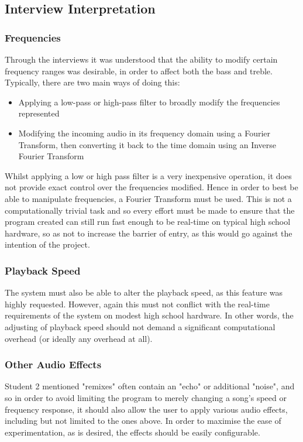 \pagebreak
\subsection{Interview Interpretation}
\subsubsection{Frequencies}
Through the interviews it was understood that the ability to modify certain frequency ranges was desirable, in order to affect both the bass and treble. Typically, there are two main ways of doing this:
\begin{itemize}
	\item Applying a low-pass or high-pass filter to broadly modify the frequencies represented
	\item Modifying the incoming audio in its frequency domain using a Fourier Transform, then converting it back to the time domain using an Inverse Fourier Transform
\end{itemize}
Whilst applying a low or high pass filter is a very inexpensive operation, it does not provide exact control over the frequencies modified. Hence in order to best be able to manipulate frequencies, a Fourier Transform must be used.  This is not a computationally trivial task and so every effort must be made to ensure that the program created can still run fast enough to be real-time on typical high school hardware, so as not to increase the barrier of entry, as this would go against the intention of the project.

\subsubsection{Playback Speed}
The system must also be able to alter the playback speed, as this feature was highly requested. However, again this must not conflict with the real-time requirements of the system on modest high school hardware. In other words, the adjusting of playback speed should not demand a significant computational overhead (or ideally any overhead at all).

\subsubsection{Other Audio Effects}
Student 2 mentioned "remixes" often contain an "echo" or additional "noise", and so in order to avoid limiting the program to merely changing a song's speed or frequency response, it should also allow the user to apply various audio effects, including but not limited to the ones above. In order to maximise the ease of experimentation, as is desired, the effects should be easily configurable.

